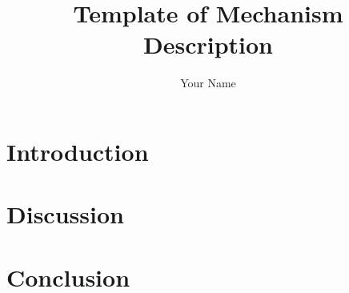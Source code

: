 \documentclass[12pt]{article}
\title{Template of Mechanism Description}
\author{Your Name}
\begin{document}
\maketitle

\section{Introduction} 



   

\section{Discussion}

\section{Conclusion}
\end{document}
